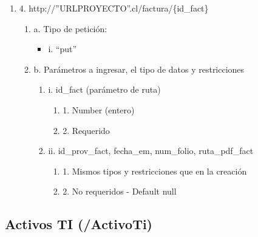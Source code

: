 \begin{enumerate}
    \item 4. http://”URLPROYECTO”.cl/factura/\{id\_fact\}
    \begin{enumerate}
        \item a. Tipo de petición:
            \begin{itemize}
               \item i. “put”
            \end{itemize}
        \item b. Parámetros a ingresar, el tipo de datos y restricciones
            \begin{enumerate}
                \item i. id\_fact (parámetro de ruta)
                    \begin{enumerate}
                        \item 1. Number (entero)
                        \item 2. Requerido
                    \end{enumerate}
                \item ii. id\_prov\_fact, fecha\_em, num\_folio, ruta\_pdf\_fact
                    \begin{enumerate}
                        \item 1. Mismos tipos y restricciones que en la creación
                        \item 2. No requeridos - Default null
                    \end{enumerate}
            \end{enumerate}
    \end{enumerate}
\end{enumerate}

\subsection{Activos TI (/ActivoTi)}

